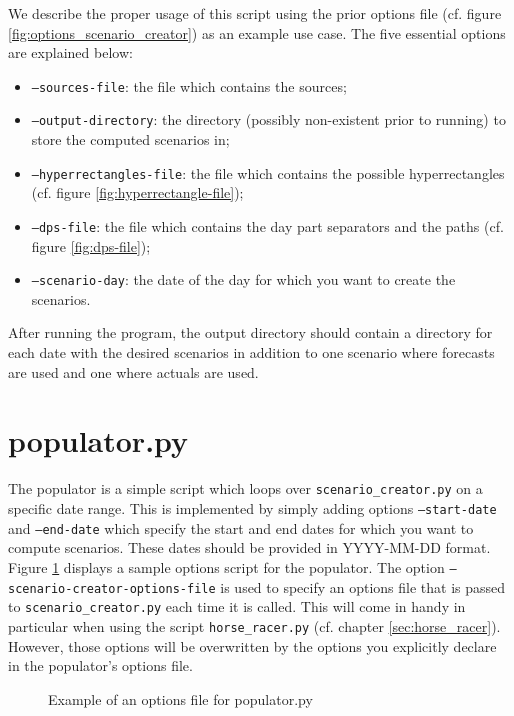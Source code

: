\documentclass[11pt]{article}
\begin{document}
We describe the proper usage of this script using the prior options file (cf. figure \ref{fig:options_scenario_creator}) as an example use case. The five essential options are explained below:
\begin{itemize}
	\item \texttt{--sources-file}: the file which contains the sources;
	\item \texttt{--output-directory}: the directory (possibly non-existent prior to running) to store the computed scenarios in;
	\item \texttt{--hyperrectangles-file}: the file which contains the possible hyperrectangles (cf. figure \ref{fig:hyperrectangle-file});
	\item \texttt{--dps-file}: the file which contains the day part separators and the paths (cf. figure \ref{fig:dps-file});
	\item \texttt{--scenario-day}: the date of the day for which you want to create the scenarios.
\end{itemize}

After running the program, the output directory should contain a directory for each date with the desired scenarios in addition to one scenario where forecasts are used and one where actuals are used.

\section{populator.py}

The populator is a simple script which loops over \texttt{scenario\_creator.py} on a specific date range. This is implemented by simply adding options \texttt{--start-date} and \texttt{--end-date} which specify the start and end dates for which you want to compute scenarios. These dates should be provided in YYYY-MM-DD format.
Figure \ref{fig:options_populator} displays a sample options script for the populator. The option \texttt{--scenario-creator-options-file} is used to specify an options file that is passed to \texttt{scenario\_creator.py} each time it is called. This will come in handy in particular when using the script \texttt{horse\_racer.py} (cf. chapter \ref{sec:horse_racer}). However, those options will be overwritten by the options you explicitly declare in the populator's options file.

\begin{figure}[H]
	\begin{framed}
		
	\end{framed}
	\caption{Example of an options file for populator.py}
	\label{fig:options_populator}
\end{figure}
\end{document}
